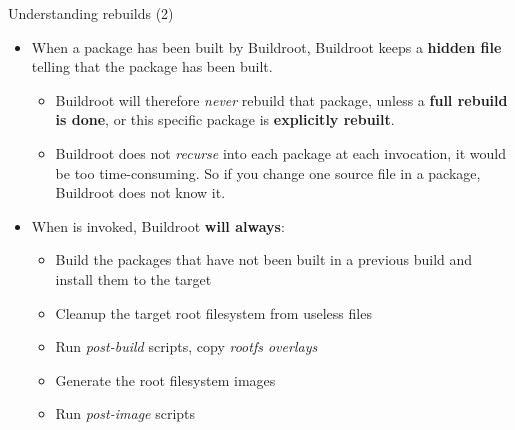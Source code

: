 \begin{frame}{Understanding rebuilds (2)}
  \begin{itemize}
  \item When a package has been built by Buildroot, Buildroot keeps a
    {\bf hidden file} telling that the package has been built.
    \begin{itemize}
    \item Buildroot will therefore {\em never} rebuild that package,
      unless a {\bf full rebuild is done}, or this specific package is
      {\bf explicitly rebuilt}.
    \item Buildroot does not {\em recurse} into each package at each
       invocation, it would be too time-consuming. So if
      you change one source file in a package, Buildroot does not know
      it.
    \end{itemize}
  \item When  is invoked, Buildroot {\bf will always}:
    \begin{itemize}
    \item Build the packages that have not been built in a previous
      build and install them to the target
    \item Cleanup the target root filesystem from useless files
    \item Run {\em post-build} scripts, copy {\em rootfs overlays}
    \item Generate the root filesystem images
    \item Run {\em post-image} scripts
    \end{itemize}
  \end{itemize}
\end{frame}

